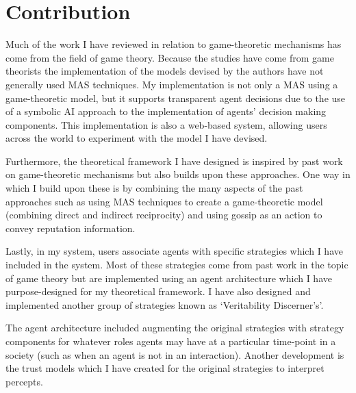 \documentclass[]{final_report}
\begin{document}
\section{Contribution}
Much of the work I have reviewed in relation to game-theoretic mechanisms has come from the field of game theory. Because the studies have come from game theorists the implementation of the models devised by the authors have not generally used MAS techniques. My implementation is not only a MAS using a game-theoretic model, but it supports transparent agent decisions due to the use of a symbolic AI approach to the implementation of agents' decision making components. This implementation is also a web-based system, allowing users across the world to experiment with the model I have devised.\par
Furthermore, the theoretical framework I have designed is inspired by past work on game-theoretic mechanisms but also builds upon these approaches. One way in which I build upon these is by combining the many aspects of the past approaches such as using MAS techniques to create a game-theoretic model (combining direct and indirect reciprocity) and using gossip as an action to convey reputation information.\par
Lastly, in my system, users associate agents with specific strategies which I have included in the system. Most of these strategies come from past work in the topic of game theory but are implemented using an agent architecture which I have purpose-designed for my theoretical framework. I have also designed and implemented another group of strategies known as `Veritability Discerner's'.\par 
The agent architecture included augmenting the original strategies with strategy components for whatever roles agents may have at a particular time-point in a society (such as when an agent is not in an interaction). Another development is the trust models which I have created for the original strategies to interpret percepts.
\end{document}
